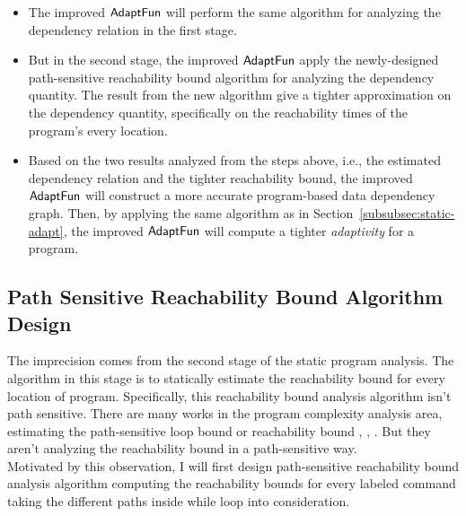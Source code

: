 \begin{enumerate}
\begin{itemize}
    \item The improved $\textsf{AdaptFun}$ will perform the same algorithm for analyzing the dependency relation in the first stage.
    \item But in the second stage, the improved $\textsf{AdaptFun}$ 
    apply the newly-designed  path-sensitive reachability bound algorithm for analyzing the dependency quantity.
    The result from the new algorithm 
    give a tighter approximation on the dependency quantity,
    specifically on the reachability times of the program's every location.
    \item Based on the two results analyzed from the steps above, 
    i.e., the estimated dependency relation and the tighter reachability bound, the improved $\textsf{AdaptFun}$ will construct
a more accurate program-based data dependency graph.
Then, by applying the same algorithm as in Section~\ref{subsubsec:static-adapt}, 
the improved $\textsf{AdaptFun}$ will compute a tighter \emph{adaptivity} for a program.%
\end{itemize}
\end{enumerate}

\subsection{Path Sensitive Reachability Bound Algorithm Design}
\label{subsec:refine-static-psreachability}
The imprecision comes from the second stage of the static program analysis.
The algorithm in this stage is to statically estimate the 
reachability bound for every location of program.
Specifically, this reachability bound analysis algorithm isn't path sensitive. 
There are many works in the program complexity analysis area, estimating the path-sensitive loop bound 
or reachability bound
\cite{GustafssonEL05, HumenbergerJK18}, 
\cite{BrockschmidtEFFG16,AlbertAGP08,AliasDFG10,Flores-MontoyaH14}, 
\cite{GulwaniZ10, SinnZV17,GulwaniJK09, GulwaniMC09, abs-2203-04243}. 
But they aren't analyzing the reachability
bound in a path-sensitive way.
\\
Motivated by this observation, I will first design path-sensitive reachability bound analysis algorithm computing the 
reachability bounds for every labeled command taking the different paths inside while loop into consideration.
\\

